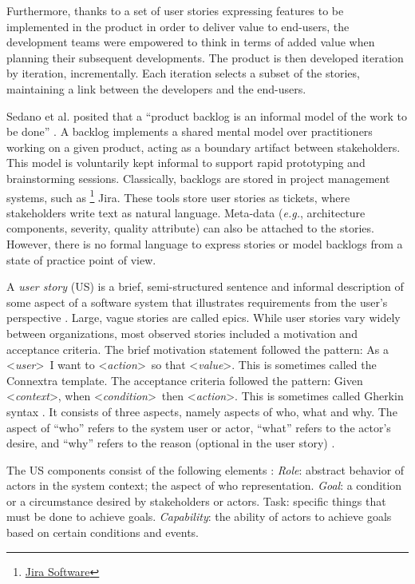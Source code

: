 Furthermore, thanks to a set of user stories expressing features to be implemented in the product in order to deliver value to end-users, the development teams were empowered to think in terms of added value when planning their subsequent developments. The product is then developed iteration by iteration, incrementally. Each iteration selects a subset of the stories, maintaining a link between the developers and the end-users\cite{mosser2022modelling}. 

Sedano et al. posited that a \enquote{product backlog is an informal model of the work to be done} \cite{sedano2019product}. A backlog implements a shared mental model over practitioners working on a given product, acting as a boundary artifact between stakeholders. This model is voluntarily kept informal to support rapid prototyping and brainstorming sessions. Classically, backlogs are stored in project management systems, such as \footnote{\href{https://www.atlassian.com/en/software/jira}{Jira Software}} Jira. These tools store user stories as tickets, where stakeholders write text as natural language. Meta-data (\emph{e.g.}, architecture components, severity, quality attribute) can also be attached to the stories. However, there is no formal language to express stories or model backlogs from a state of practice point of view.

A \emph{user story} (US) is a brief, semi-structured sentence and informal description of some aspect of a software system that illustrates requirements from the user’s perspective \cite{raharjana2021user}. Large, vague stories are called epics. While user stories vary widely between organizations, most observed stories included a motivation and acceptance criteria. The brief motivation statement followed the pattern:  As a  \textless\emph{user}\textgreater\ I want to \textless\emph{action}\textgreater\ so that \textless\emph{value}\textgreater. This is sometimes called the Connextra template. The acceptance criteria followed the pattern: Given \textless\emph{context}\textgreater, when \textless\emph{condition}\textgreater \  then \textless\emph{action}\textgreater. This is sometimes called Gherkin syntax \cite{wynne2017cucumber}. It consists of three aspects, namely aspects of who, what and why. The aspect of \enquote{who} refers to the system user or actor, \enquote{what} refers to the actor’s desire, and \enquote{why} refers to the reason (optional in the user story) \cite{raharjana2021user}.

The US components consist of the following elements \cite{wautelet2017user} : \emph{Role}: abstract behavior of actors in the system context; the aspect of who representation. \emph{Goal}: a condition or a circumstance desired by stakeholders or actors. Task: specific things that must be done to achieve goals. \emph{Capability}: the ability of actors to achieve goals based on certain conditions and events.

